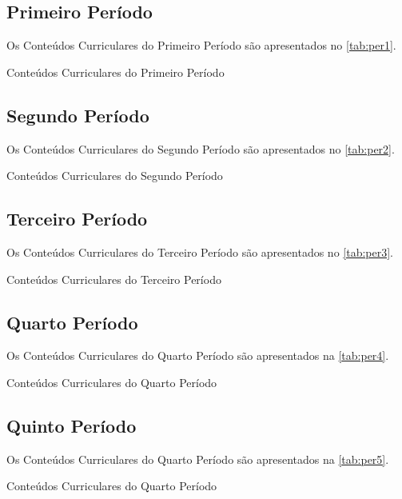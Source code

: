 \subsection{Primeiro Período}

Os Conteúdos Curriculares do Primeiro Período são apresentados no \autoref{tab:per1}.

\begin{table}[htb!]
	\centering\tiny
	\caption{Conteúdos Curriculares do Primeiro Período}
	\label{tab:per1}
		
\end{table}

\subsection{Segundo Período}

Os Conteúdos Curriculares do Segundo Período são apresentados no \autoref{tab:per2}.

\begin{table}[htb!]
	\centering\tiny
	\caption{Conteúdos Curriculares do Segundo Período}
	\label{tab:per2}
	
\end{table}

\subsection{Terceiro Período}

Os Conteúdos Curriculares do Terceiro Período são apresentados no \autoref{tab:per3}.

\begin{table}[htb!]
	\centering\tiny
	\caption{Conteúdos Curriculares do Terceiro Período}
	\label{tab:per3}
		
\end{table}

\subsection{Quarto Período}

Os Conteúdos Curriculares do Quarto Período são apresentados na \autoref{tab:per4}.

\begin{table}[htb!]
	\centering\tiny
	\caption{Conteúdos Curriculares do Quarto Período}
	\label{tab:per4}
		
\end{table}

\subsection{Quinto Período}
\label{sub:quinto}

Os Conteúdos Curriculares do Quarto Período são apresentados na \autoref{tab:per5}.

\begin{table}[htb!]
	\centering\tiny
	\caption{Conteúdos Curriculares do Quarto Período}
	\label{tab:per5}
	
	
\end{table}